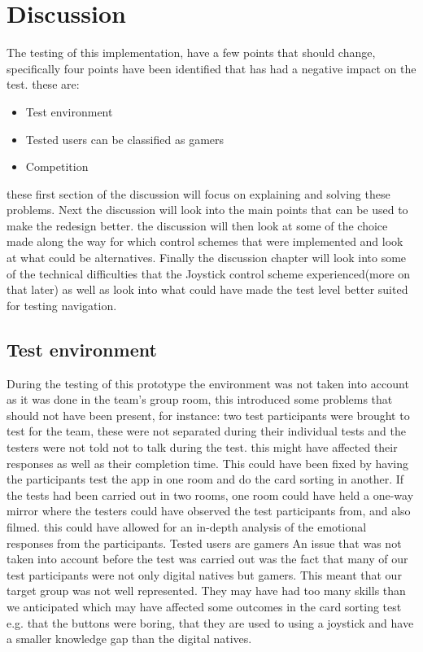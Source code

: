 \chapter{Discussion}
The testing of this implementation, have a few points that should change, specifically four points have been identified that has had a negative impact on the test. these are:
\begin{itemize}
\item Test environment
\item Tested users can be classified as gamers
\item Competition
\end{itemize}
these first section of the discussion will focus on explaining and solving these problems. Next the discussion will look into the main points that can be used to make the redesign better. the discussion will then look at some of the choice made along the way for which control schemes that were implemented and look at what could be alternatives. Finally the discussion chapter will look into some of the technical difficulties that the Joystick control scheme experienced(more on that later) as well as look into what could have made the test level better suited for testing navigation.


\section{Test environment}  
During the testing of this prototype the environment was not taken into account as it was done in the team's group room, this introduced some problems that should not have been present, for instance: two test participants were brought to test for the team, these were not separated during their individual tests and the testers were not told not to talk during the test. this might have affected their responses as well as their completion time. This could have been fixed by having the participants test the app in one room and do the card sorting in another. If the tests had been carried out in two rooms, one room could have held a one-way mirror where the testers could have observed the test participants from, and also filmed. this could have allowed for an in-depth analysis of the emotional responses from the participants. 
Tested users are gamers
An issue that was not taken into account before the test was carried out was the fact that many of our test participants were not only digital natives but gamers. This meant that our target group was not well represented. They may have had too many skills than we anticipated which may have affected some outcomes in the card sorting test e.g. that the buttons were boring, that they are used to using a joystick and have a smaller knowledge gap than the digital natives.

